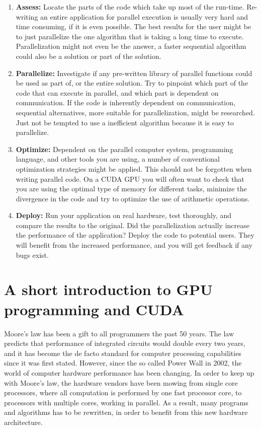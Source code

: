 \begin{enumerate}
    \item \textbf{Assess:} Locate the parts of the code which take up most of the run-time. Re-writing an entire application for parallel execution is usually very hard and time consuming, if it is even possible. The best results for the user might be to just parallelize the one algorithm that is taking a long time to execute. Parallelization might not even be the answer, a faster sequential algorithm could also be a solution or part of the solution.

    \item \textbf{Parallelize:} Investigate if any pre-written library of parallel functions could be used as part of, or the entire solution. Try to pinpoint which part of the code that can execute in parallel, and which part is dependent on communication. If the code is inherently dependent on communication, sequential alternatives, more suitable for parallelization, might be researched. Just not be tempted to use a inefficient algorithm because it is easy to parallelize.

    \item \textbf{Optimize:} Dependent on the parallel computer system, programming language, and other tools you are using, a number of conventional optimization strategies might be applied. This should not be forgotten when writing parallel code. On a CUDA GPU you will often want to check that you are using the optimal type of memory for different tasks, minimize the divergence in the code and try to optimize the use of arithmetic operations. 

    \item \textbf{Deploy:} Run your application on real hardware, test thoroughly, and compare the results to the original. Did the parallelization actually increase the performance of the application? Deploy the code to potential users. They will benefit from the increased performance, and you will get feedback if any bugs exist.
\end{enumerate}

\section{A short introduction to GPU programming and CUDA} %
\label{sub:a_short_introduction_to_gpu_programming_and_cuda}

Moore's law has been a gift to all programmers the past 50 years. The law predicts that performance of integrated circuits would double every two years, and it has become the de facto standard for computer processing capabilities since it was first stated. However, since the so called Power Wall in 2002, the world of computer hardware performance has been changing. In order to keep up with Moore's law, the hardware vendors have been mowing from single core processors, where all computation is performed by one fast processor core, to processors with multiple cores, working in parallel. As a result, many programs and algorithms has to be rewritten, in order to benefit from this new hardware architecture.

